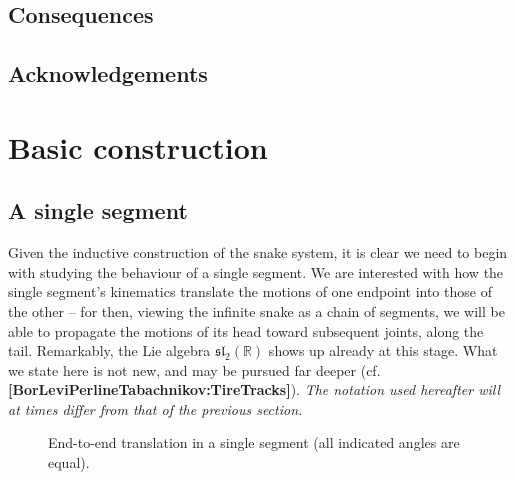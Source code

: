 \documentclass{article}
\def\fsl{\mathfrak{sl}}
\def\RR{\mathbb{R}}
\theoremstyle{definition}
\begin{document}
\subsection{Consequences}

\subsection{Acknowledgements}


\section{Basic construction}
\label{sec:basic}
\subsection{A single segment}
Given the inductive construction of the snake system,
it is clear we need to begin with studying the behaviour of a single
segment. We are interested with how the single segment's kinematics
translate the motions of one endpoint into those of the other -- for then,
viewing the infinite snake as a chain of segments, we will be able
to propagate the motions of its head toward subsequent joints, along the tail. 
Remarkably, the Lie algebra $\fsl_2(\RR)$ shows up already at this stage. 
What
we state here is not new, and may be pursued far deeper (cf. {\bf[BorLeviPerlineTabachnikov:TireTracks]}).
\emph{The notation used hereafter will at times differ from that of the previous section.}


\begin{figure} %
        \begin{center}\end{center}
        \caption{End-to-end translation in a single segment (all indicated angles
        are equal).\label{fig:seg}}
\end{figure}
\end{document}
